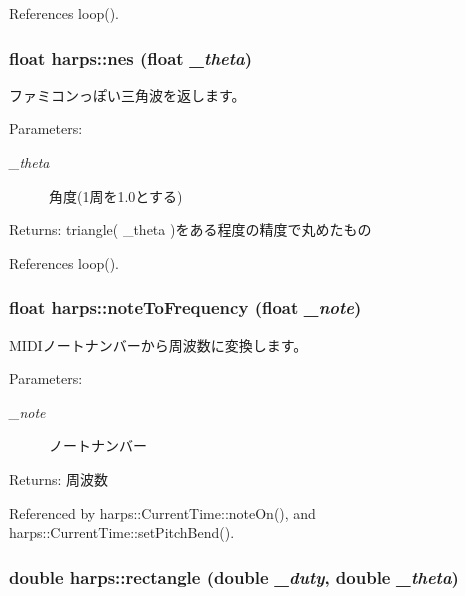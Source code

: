References loop().
\subsubsection[nes]{\setlength{\rightskip}{0pt plus 5cm}float harps::nes (float {\em \_\-theta})\hspace{0.3cm}{\tt  [inline]}}\label{namespaceharps_99acf61c717498656a088ceb0c6d8e3e}


ファミコンっぽい三角波を返します。 \begin{Desc}
\item[Parameters:]
\begin{description}
\item[{\em \_\-theta}]角度(1周を1.0とする) \end{description}
\end{Desc}
\begin{Desc}
\item[Returns:]triangle( \_\-theta )をある程度の精度で丸めたもの \end{Desc}


References loop().
\subsubsection[noteToFrequency]{\setlength{\rightskip}{0pt plus 5cm}float harps::noteToFrequency (float {\em \_\-note})\hspace{0.3cm}{\tt  [inline]}}\label{namespaceharps_4f7bddae87173a07222e7cd4b32519bb}


MIDIノートナンバーから周波数に変換します。 \begin{Desc}
\item[Parameters:]
\begin{description}
\item[{\em \_\-note}]ノートナンバー \end{description}
\end{Desc}
\begin{Desc}
\item[Returns:]周波数 \end{Desc}


Referenced by harps::CurrentTime::noteOn(), and harps::CurrentTime::setPitchBend().
\subsubsection[rectangle]{\setlength{\rightskip}{0pt plus 5cm}double harps::rectangle (double {\em \_\-duty}, \/  double {\em \_\-theta})\hspace{0.3cm}{\tt  [inline]}}\label{namespaceharps_77bf2d30984c1216bd4809e722675683}


